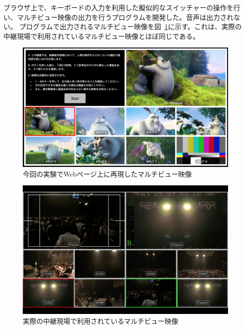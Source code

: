 ブラウザ上で、キーボードの入力を利用した擬似的なスイッチャーの操作を行い、マルチビュー映像の出力を行うプログラムを開発した。音声は出力されない。
プログラムで出力されるマルチビュー映像を図~\ref{fig:mv-delay-virtual}に示す。これは、実際の中継現場で利用されているマルチビュー映像とほぼ同じである。

\begin{figure}[htbp]
  \begin{center}
    \includegraphics[bb=0 0 1294 750,width=14cm]{img/mv-delay-virtual.png}
  \end{center}
  \caption{今回の実験でWebページ上に再現したマルチビュー映像}
  \label{fig:mv-delay-virtual}
\end{figure}

\begin{figure}[htbp]
  \begin{center}
    \includegraphics[bb=0 0 1680 1050,width=14cm]{img/mv-delay-actual.png}
  \end{center}
  \caption{実際の中継現場で利用されているマルチビュー映像}
  \label{fig:mv-delay-actual}
\end{figure}

